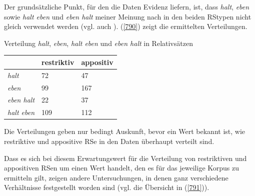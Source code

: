 \label{sec:ergeb}
Der grundsätzliche Punkt, für den die Daten Evidenz liefern, ist, dass \textit{halt}, \textit{eben} sowie \textit{halt eben} und \textit{eben halt} meiner Meinung nach in den beiden RStypen nicht gleich verwendet werden (vgl. auch \citealt[169-171]{Mueller2016a}). (\ref{790}) zeigt die ermittelten Verteilungen.

\begin{exe}
	\ex\label{790} Verteilung \textit{halt}, \textit{eben}, \textit{halt eben} und \textit{eben halt} in Relativsätzen\\[-1em]
     \begin{tabular}[t]{|l|l|l|}
     \hline
	  & \textbf{restriktiv} & \textbf{appositiv}\\
	 \hline\hline
	 \textit{halt} & 72 & 47\\
	 \hline
	 \textit{eben} & 99 & 167\\
	 \hline\hline
	 \textit{eben halt} & 22 & 37\\	 
	 \hline
	 \textit{halt eben} & 109 & 112\\
	 \hline       
     \end{tabular}
\end{exe}
Die Verteilungen geben nur bedingt Auskunft, bevor ein Wert bekannt ist, wie restriktive und appositive RSe in den Daten überhaupt verteilt sind. 

Dass es sich bei diesem Erwartungswert für die Verteilung von restriktiven und appositiven RSen um einen Wert handelt, den es für das jeweilige Korpus zu ermitteln gilt, zeigen andere Untersuchungen, in denen ganz verschiedene Verhältnisse festgestellt worden sind (vgl. die Übersicht in (\ref{791})).

